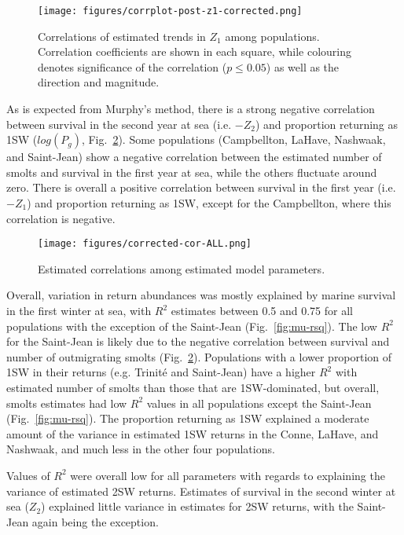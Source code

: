 \documentclass[12pt]{article}
\begin{document}
\begin{figure}[htbp] \centering
    \texttt{[image: figures/corrplot-post-z1-corrected.png]} \caption{
        Correlations of estimated trends in $Z_1$ among populations. 
        Correlation coefficients are shown in each square, while colouring 
        denotes significance of the correlation ($p \leq 0.05$) as well as the direction and magnitude.}
\label{fig:s1-corr} 
\end{figure}

As is expected from Murphy's method, there is a strong negative correlation
between survival in the second year at sea (i.e. $-Z_2$) and proportion returning
as 1SW ($log(P_g)$, Fig.~\ref{fig:cor-params}). Some populations (Campbellton,
LaHave, Nashwaak, and Saint-Jean) show a negative correlation between the
estimated number of smolts and survival in the first year at sea, while the
others fluctuate around zero. There is overall a positive correlation between
survival in the first year (i.e. $-Z_1$) and proportion returning as 1SW,
except for the Campbellton, where this correlation is negative.

\begin{figure}[htbp] \centering
    \texttt{[image: figures/corrected-cor-ALL.png]}
    \caption{Estimated correlations among estimated model parameters.}
    \label{fig:cor-params} 
\end{figure}

Overall, variation in return abundances was mostly explained by marine survival in the
first winter at sea, with $R^2$ estimates between 0.5 and 0.75 for all populations
with the exception of the Saint-Jean (Fig.~\ref{fig:mu-rsq}).
The low $R^2$ for the Saint-Jean is likely due to the negative correlation
between survival and number of outmigrating smolts (Fig.~\ref{fig:cor-params}). 
Populations with a lower proportion of 1SW in their returns (e.g. Trinit\'{e}
and Saint-Jean) have a higher $R^2$ with estimated number of smolts than those
that are 1SW-dominated, but overall, smolts estimates had low $R^2$ values in 
all populations except the Saint-Jean (Fig.~\ref{fig:mu-rsq}).
The proportion returning as 1SW explained a moderate amount of the variance in
estimated 1SW returns in the Conne, LaHave, and Nashwaak, and much less in the
other four populations.

Values of $R^2$ were overall low for all parameters with regards to explaining
the variance of estimated 2SW returns. Estimates of survival in the second winter at sea ($Z_2$)
explained little variance in estimates for 2SW returns, with the Saint-Jean again being the
exception.
\end{document}
